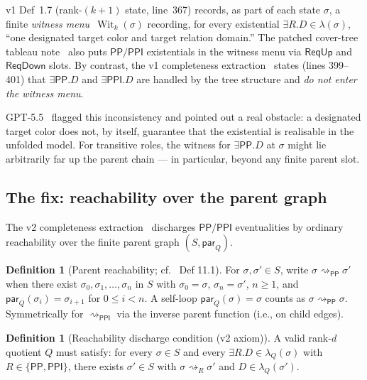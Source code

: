 \documentclass[11pt]{article}
\theoremstyle{definition}
\newtheorem{definition}[theorem]{Definition}
\theoremstyle{remark}
\newcommand{\PP}{\mathsf{PP}}
\newcommand{\PPI}{\mathsf{PPI}}
\newcommand{\Wit}{\operatorname{Wit}}
\newcommand{\reach}{\rightsquigarrow}
\begin{document}
v1 Def~1.7 (rank-$(k+1)$ state, line~367) records, as part of
each state $\sigma$, a finite \emph{witness menu}~$\Wit_k(\sigma)$
recording, for every existential $\exists R.D \in \lambda(\sigma)$,
``one designated target color and target relation domain.'' The
patched cover-tree tableau note~\cite{CoverTreeTableauPatched} also
puts $\PP/\PPI$ existentials in the witness menu via $\mathsf{ReqUp}$
and $\mathsf{ReqDown}$ slots. By contrast, the v1 completeness
extraction~\cite{CompletenessV1} states (lines 399--401) that
$\exists\PP.D$ and $\exists\PPI.D$ are handled by the tree
structure and \emph{do not enter the witness menu}.

GPT-5.5~\cite{GPT55Review} flagged this inconsistency and pointed
out a real obstacle: a designated target color does not, by
itself, guarantee that the existential is realisable in the
unfolded model. For transitive roles, the witness for
$\exists\PP.D$ at $\sigma$ might lie arbitrarily far up the
parent chain --- in particular, beyond any finite parent slot.

\subsection{The fix: reachability over the parent graph}

The v2 completeness extraction~\cite[\S 11]{CompletenessV2}
discharges $\PP/\PPI$ eventualities by ordinary reachability over
the finite parent graph $(S, \mathsf{par}_Q)$.

\begin{definition}[Parent reachability;
  cf.\ \cite{CompletenessV2} Def 11.1]\label{def:parent-reach}
For $\sigma, \sigma' \in S$, write $\sigma \reach_{\PP} \sigma'$
when there exist $\sigma_0,\sigma_1,\ldots,\sigma_n$ in $S$ with
$\sigma_0 = \sigma$, $\sigma_n = \sigma'$, $n \ge 1$, and
$\mathsf{par}_Q(\sigma_i) = \sigma_{i+1}$ for $0 \le i < n$.
A self-loop $\mathsf{par}_Q(\sigma) = \sigma$ counts as $\sigma
\reach_{\PP} \sigma$. Symmetrically for $\reach_{\PPI}$ via the
inverse parent function (i.e., on child edges).
\end{definition}

\begin{definition}[Reachability discharge condition (v2 axiom)]
\label{def:reach-discharge}
A valid rank-$d$ quotient $Q$ must satisfy: for every $\sigma \in
S$ and every $\exists R.D \in \lambda_Q(\sigma)$ with $R \in
\{\PP, \PPI\}$, there exists $\sigma' \in S$ with
$\sigma \reach_R \sigma'$ and $D \in \lambda_Q(\sigma')$.
\end{definition}
\end{document}
